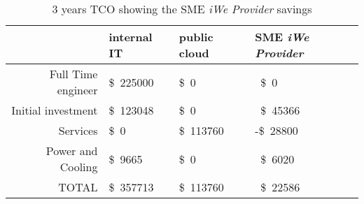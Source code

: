 \begin{table}
    \centering
    \begin{tabular}{r l l | l}
                                    & internal IT     & public cloud      &
                                    SME \textit{iWe Provider}          \\
        \hline
        Full Time engineer          & \SI{225000}[\$]{} & \SI{0}[\$]{}      
                                    & ~\SI{0}[\$]{}      \\
        \hline
        Initial investment          & \SI{123048}[\$]{} & \SI{0}[\$]{}      
                                    & ~\SI{45366}[\$]{}  \\
        \hline
        Services                    & \SI{0}[\$]{}      & \SI{113760}[\$]{} 
                                    & -\SI{28800}[\$]{} \\
        \hline
        Power and Cooling           & \SI{9665}[\$]{}   & \SI{0}[\$]{}      
                                    & ~\SI{6020}[\$]{}   \\
        \hline
        TOTAL                       & \SI{357713}[\$]{} & \SI{113760}[\$]{} 
                                    & ~\SI{22586}[\$]{}  \\
    \end{tabular}
    \caption{3 years TCO showing the SME \textit{iWe Provider} savings}
    \label{table:clouds-comparison}
\end{table}
